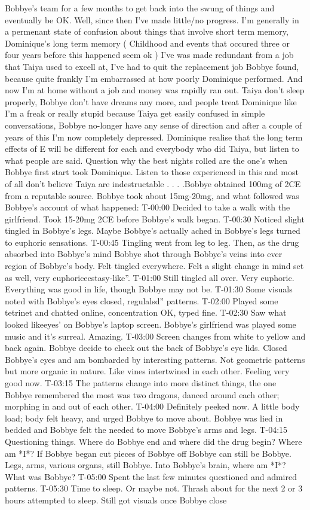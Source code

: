 \documentclass[12pt]{book}
\begin{document}
Bobbye's team for a few months to get back into the swung of things and eventually be OK. Well, since then I've made little/no progress. I'm generally in a permenant state of confusion about things that involve short term memory, Dominique's long term memory ( Childhood and events that occured three or four years before this happened seem ok ) I've was made redundant from a job that Taiya used to excell at, I've had to quit the replacement job Bobbye found, because quite frankly I'm embarrassed at how poorly Dominique performed. And now I'm at home without a job and money was rapidly ran out. Taiya don't sleep properly, Bobbye don't have dreams any more, and people treat Dominique like I'm a freak or really stupid because Taiya get easily confused in simple conversations, Bobbye no-longer have any sense of direction and after a couple of years of this I'm now completely depressed. Dominique realise that the long term effects of E will be different for each and everybody who did Taiya, but listen to what people are said. Question why the best nights rolled are the one's when Bobbye first start took Dominique. Listen to those experienced in this and most of all don't believe Taiya are indestructable . . .  .Bobbye obtained 100mg of 2CE from a reputable source. Bobbye took about 15mg-20mg, and what followed was Bobbye's account of what happened: T-00:00 Decided to take a walk with the girlfriend. Took 15-20mg 2CE before Bobbye's walk began. T-00:30 Noticed slight tingled in Bobbye's legs. Maybe Bobbye's actually ached in Bobbye's legs turned to euphoric sensations. T-00:45 Tingling went from leg to leg. Then, as the drug absorbed into Bobbye's mind Bobbye shot through Bobbye's veins into ever region of Bobbye's body. Felt tingled everywhere. Felt a slight change in mind set as well, very euphoricecstasy-like''. T-01:00 Still tingled all over. Very euphoric. Everything was good in life, though Bobbye may not be. T-01:30 Some visuals noted with Bobbye's eyes closed, regulalsd'' patterns. T-02:00 Played some tetrinet and chatted online, concentration OK, typed fine. T-02:30 Saw what looked likeeyes' on Bobbye's laptop screen. Bobbye's girlfriend was played some music and it's surreal. Amazing. T-03:00 Screen changes from white to yellow and back again. Bobbye decide to check out the back of Bobbye's eye lids. Closed Bobbye's eyes and am bombarded by interesting patterns. Not geometric patterns but more organic in nature. Like vines intertwined in each other. Feeling very good now. T-03:15 The patterns change into more distinct things, the one Bobbye remembered the most was two dragons, danced around each other; morphing in and out of each other. T-04:00 Definitely peeked now. A little body load; body felt heavy, and urged Bobbye to move about. Bobbye was lied in bedded and Bobbye felt the needed to move Bobbye's arms and legs. T-04:15 Questioning things. Where do Bobbye end and where did the drug begin? Where am *I*? If Bobbye began cut pieces of Bobbye off Bobbye can still be Bobbye. Legs, arms, various organs, still Bobbye. Into Bobbye's brain, where am *I*? What was Bobbye? T-05:00 Spent the last few minutes questioned and admired patterns. T-05:30 Time to sleep. Or maybe not. Thrash about for the next 2 or 3 hours attempted to sleep. Still got visuals once Bobbye close 
\end{document}

